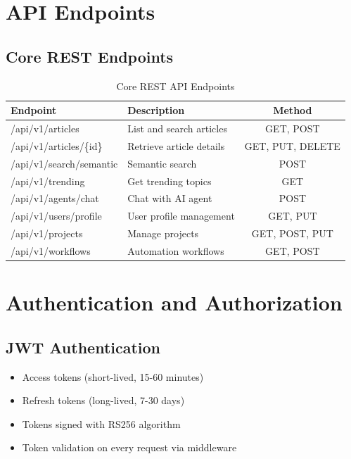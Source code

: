 \documentclass[12pt,a4paper]{report}
\begin{document}
\section{API Endpoints}

\subsection{Core REST Endpoints}

\begin{table}[H]
\centering
\small
\begin{tabular}{|l|l|c|}
\hline
\textbf{Endpoint} & \textbf{Description} & \textbf{Method} \\
\hline
/api/v1/articles & List and search articles & GET, POST \\
/api/v1/articles/\{id\} & Retrieve article details & GET, PUT, DELETE \\
/api/v1/search/semantic & Semantic search & POST \\
/api/v1/trending & Get trending topics & GET \\
/api/v1/agents/chat & Chat with AI agent & POST \\
/api/v1/users/profile & User profile management & GET, PUT \\
/api/v1/projects & Manage projects & GET, POST, PUT \\
/api/v1/workflows & Automation workflows & GET, POST \\
\hline
\end{tabular}
\caption{Core REST API Endpoints}
\end{table}

\section{Authentication and Authorization}

\subsection{JWT Authentication}

\begin{itemize}[label=\textbullet]
    \item Access tokens (short-lived, 15-60 minutes)
    \item Refresh tokens (long-lived, 7-30 days)
    \item Tokens signed with RS256 algorithm
    \item Token validation on every request via middleware
\end{itemize}
\end{document}
